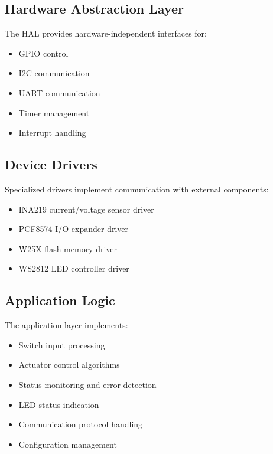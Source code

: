 \documentclass[12pt,a4paper,twoside,openright]{book}
\begin{document}
\subsection{Hardware Abstraction Layer}
The HAL provides hardware-independent interfaces for:
\begin{itemize}
    \item GPIO control
    \item I2C communication
    \item UART communication
    \item Timer management
    \item Interrupt handling
\end{itemize}

\subsection{Device Drivers}
Specialized drivers implement communication with external components:
\begin{itemize}
    \item INA219 current/voltage sensor driver
    \item PCF8574 I/O expander driver
    \item W25X flash memory driver
    \item WS2812 LED controller driver
\end{itemize}

\subsection{Application Logic}
The application layer implements:
\begin{itemize}
    \item Switch input processing
    \item Actuator control algorithms
    \item Status monitoring and error detection
    \item LED status indication
    \item Communication protocol handling
    \item Configuration management
\end{itemize}
\end{document}
